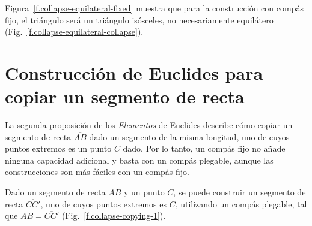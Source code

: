 Figura~\ref{f.collapse-equilateral-fixed} muestra que para la construcción con compás fijo, el triángulo será un triángulo isósceles, no necesariamente equilátero (Fig.~\ref{f.collapse-equilateral-collapse}).

\section{Construcción de Euclides para copiar un segmento de recta}\label{s.collapse-copy}

La segunda proposición de los \textit{Elementos} de Euclides describe cómo copiar un segmento de recta $\overline{AB}$ dado un segmento de la misma longitud, uno de cuyos puntos extremos es un punto $C$ dado. Por lo tanto, un compás fijo no añade ninguna capacidad adicional y basta con un compás plegable, aunque las construcciones son más fáciles con un compás fijo.

\begin{theorem}
Dado un segmento de recta $\overline{AB}$ y un punto $C$, se puede construir un segmento de recta $\overline{CC'}$, uno de cuyos puntos extremos es $C$, utilizando un compás plegable, tal que $\overline{AB}=\overline{CC'}$ (Fig.~\ref{f.collapse-copying-1}).
\end{theorem}

